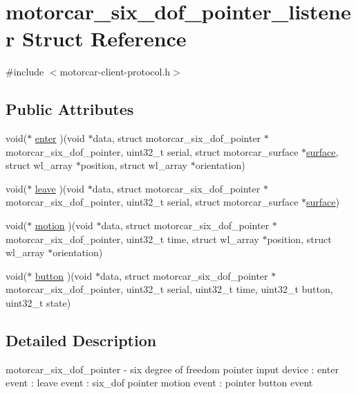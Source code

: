 \hypertarget{structmotorcar__six__dof__pointer__listener}{\section{motorcar\-\_\-six\-\_\-dof\-\_\-pointer\-\_\-listener Struct Reference}
\label{structmotorcar__six__dof__pointer__listener}
}


{\ttfamily \#include $<$motorcar-\/client-\/protocol.\-h$>$}

\subsection*{Public Attributes}
\begin{DoxyCompactItemize}
\item 
void($\ast$ \hyperlink{structmotorcar__six__dof__pointer__listener_a60aa469977dee03cfe23738b53628c0a}{enter} )(void $\ast$data, struct motorcar\-\_\-six\-\_\-dof\-\_\-pointer $\ast$motorcar\-\_\-six\-\_\-dof\-\_\-pointer, uint32\-\_\-t serial, struct motorcar\-\_\-surface $\ast$\hyperlink{simple-egl_8cpp_a0720952aa1caded45b5bcdce589663a9}{surface}, struct wl\-\_\-array $\ast$position, struct wl\-\_\-array $\ast$orientation)
\item 
void($\ast$ \hyperlink{structmotorcar__six__dof__pointer__listener_ac00b36c868704689626997fd27b407b9}{leave} )(void $\ast$data, struct motorcar\-\_\-six\-\_\-dof\-\_\-pointer $\ast$motorcar\-\_\-six\-\_\-dof\-\_\-pointer, uint32\-\_\-t serial, struct motorcar\-\_\-surface $\ast$\hyperlink{simple-egl_8cpp_a0720952aa1caded45b5bcdce589663a9}{surface})
\item 
void($\ast$ \hyperlink{structmotorcar__six__dof__pointer__listener_ae2701450acd4d0c55f5b0ffa54fad191}{motion} )(void $\ast$data, struct motorcar\-\_\-six\-\_\-dof\-\_\-pointer $\ast$motorcar\-\_\-six\-\_\-dof\-\_\-pointer, uint32\-\_\-t time, struct wl\-\_\-array $\ast$position, struct wl\-\_\-array $\ast$orientation)
\item 
void($\ast$ \hyperlink{structmotorcar__six__dof__pointer__listener_a768d27906b6a34cbe6069bf830f3efdd}{button} )(void $\ast$data, struct motorcar\-\_\-six\-\_\-dof\-\_\-pointer $\ast$motorcar\-\_\-six\-\_\-dof\-\_\-pointer, uint32\-\_\-t serial, uint32\-\_\-t time, uint32\-\_\-t button, uint32\-\_\-t state)
\end{DoxyCompactItemize}


\subsection{Detailed Description}
motorcar\-\_\-six\-\_\-dof\-\_\-pointer -\/ six degree of freedom pointer input device \-: enter event \-: leave event \-: six\-\_\-dof pointer motion event \-: pointer button event

